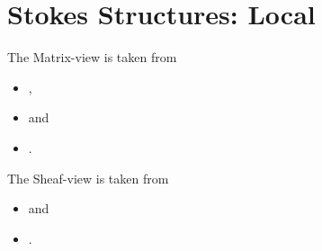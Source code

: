 \chapter{Stokes Structures: Local}
\begin{comment}
  Matrizen Sicht:
  \begin{itemize}
    \item \cite[Chapter 3]{boalch}
      \\ largely following:
      \begin{itemize}
        \item[\textbf{8}] D.G. Babbitt and V.S. Varadarajan.
        \textbf{Formal reduction theory of meromorphic differential equations:
          a group theoretic view.}
        \texttt{euclid.pjm.1102720203.pdf}
        \item[\textbf{11}] W. Balser, W.B. Jurkat, and D.A. Lutz.
        \textbf{Birkhoff invariants and Stokes’ multipliers for meromorphic
          linear differential equations.}
        \item[\textbf{40}] M. Jimbo, T. Miwa, and Kimio Ueno.
        \textbf{Monodromy preserving deformations of linear differential
          equations with rational coefficients I.}
        \item[\textbf{43}] M. Loday-Richaud
        \textbf{Stokes phenomenon, multisummability and differential Galois
          groups.}
        \item[\textbf{50}] J. Martinet and J.P. Ramis.
        \textbf{Elementary acceleration and multisummability.}
      \end{itemize}
    \item \cite{thboalch}
    \item Marius van der Put, Kyoshi Saito => Diff.Galois Theory
  \end{itemize}
  Moderne Sicht:
  \begin{itemize}
    \item Malgrange
    \item \cite{sabbah2007isomonodromic}
  \end{itemize}
\end{comment}

\begin{paracol}{2}
  The Matrix-view is taken from 
  \begin{itemize}
    \item \cite{boalch},
    \item \cite{thboalch} and
    \item \cite{van2003galois}.
  \end{itemize}
  \switchcolumn{}
  The Sheaf-view is taken from
  \begin{itemize}
    \item \cite{sabbah_cimpa90} and
    \item \cite{sabbah2007isomonodromic}.
  \end{itemize}
\end{paracol}

